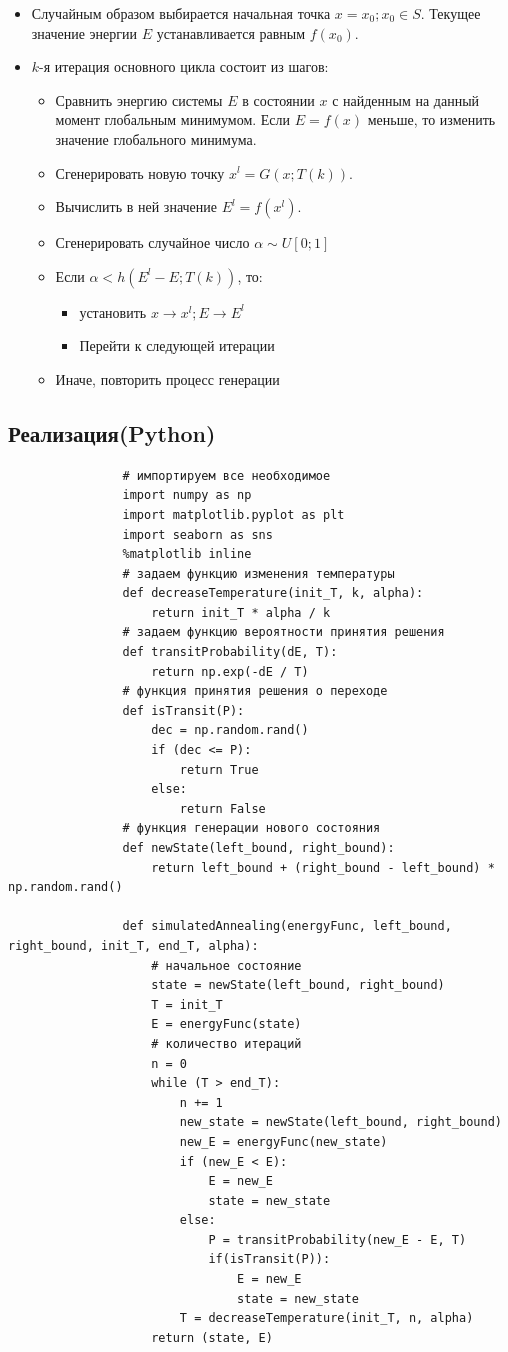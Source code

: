 \documentclass[a4paper]{article}
\begin{document}
			\begin{itemize}
				\item Случайным образом выбирается начальная точка $x = x_0; x_0 \in S$. Текущее значение энергии $E$ устанавливается равным $f(x_0)$.
				\item $k$-я итерация основного цикла состоит из шагов:
					\begin{itemize}		
						\item Сравнить энергию системы $E$ в состоянии $x$ с найденным на данный момент глобальным минимумом. Если $E = f(x)$ меньше, то изменить значение глобального минимума.
						\item Сгенерировать новую точку $x^l = G(x; T(k))$.
						\item Вычислить в ней значение $E^l = f(x^l)$.
						\item Сгенерировать случайное число $\alpha \sim U[0;1]$
						\item Если $\alpha < h(E^l - E; T(k))$, то:
							\begin{itemize}
								\item установить $x \longrightarrow x^l; E \longrightarrow E^l$
								\item Перейти к следующей итерации
							\end{itemize}
						\item Иначе, повторить процесс генерации
					\end{itemize}
			\end{itemize}
		\newpage
		\subsection{Реализация(Python)}
			\begin{verbatim}
				# импортируем все необходимое
				import numpy as np
				import matplotlib.pyplot as plt
				import seaborn as sns
				%matplotlib inline
				# задаем функцию изменения температуры
				def decreaseTemperature(init_T, k, alpha):
					return init_T * alpha / k
				# задаем функцию вероятности принятия решения
				def transitProbability(dE, T):
					return np.exp(-dE / T)
				# функция принятия решения о переходе
				def isTransit(P):
					dec = np.random.rand()
					if (dec <= P):
						return True
					else:
						return False
				# функция генерации нового состояния
				def newState(left_bound, right_bound):
					return left_bound + (right_bound - left_bound) * np.random.rand()
				
				def simulatedAnnealing(energyFunc, left_bound, right_bound, init_T, end_T, alpha):
					# начальное состояние
					state = newState(left_bound, right_bound)
					T = init_T
					E = energyFunc(state)
					# количество итераций
					n = 0
					while (T > end_T):
						n += 1
						new_state = newState(left_bound, right_bound)
						new_E = energyFunc(new_state)
						if (new_E < E):
							E = new_E
							state = new_state
						else:
							P = transitProbability(new_E - E, T)
							if(isTransit(P)):
								E = new_E
								state = new_state
						T = decreaseTemperature(init_T, n, alpha)
					return (state, E)
			\end{verbatim}
		\newpage
\end{document}
